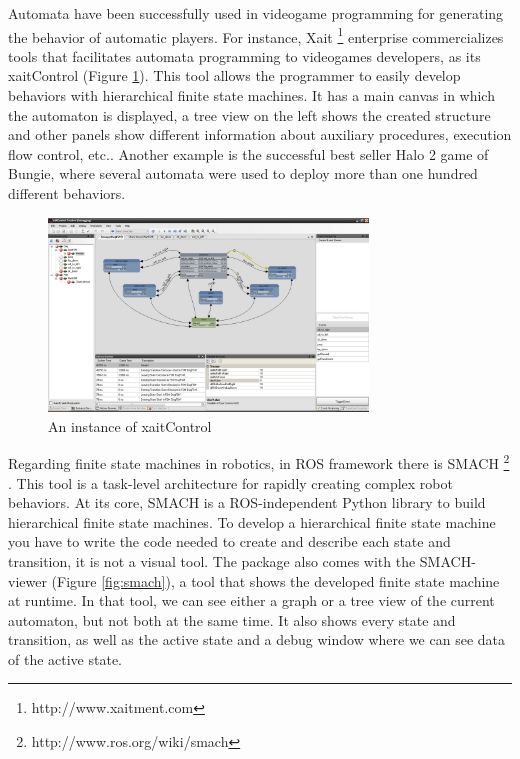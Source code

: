 \documentclass[journal,twoside]{JoPhA}
\begin{document}
Automata have been successfully used in videogame programming for generating the behavior of automatic players. For instance, Xait \footnote{http://www.xaitment.com} enterprise  commercializes  tools  that  facilitates automata programming to videogames developers, as its xaitControl (Figure \ref{fig:xaitcontrol}). This tool allows the programmer to  easily  develop  behaviors  with  hierarchical  finite  state machines. It has a main canvas in which the automaton is displayed, a tree view on the left shows the created structure and other panels show different information about auxiliary procedures, execution flow control, etc.. Another example is the successful best seller Halo 2 game of Bungie, where several automata were used to deploy more than one hundred different behaviors.

\begin{figure}[ht!]
\begin{center}
        \includegraphics[width=8.5cm]{figs/xaitcontrol.jpg}
\end{center}
\caption{An instance of xaitControl}
\label{fig:xaitcontrol}
\end{figure}

Regarding  finite  state  machines in robotics, in ROS framework there is SMACH \footnote{http://www.ros.org/wiki/smach} \cite{bohren2010,bohren2011}. This tool is a task-level architecture for rapidly creating complex robot behaviors. At its core, SMACH is a ROS-independent Python library to build hierarchical finite state machines. To develop a hierarchical finite state machine you have to write the code needed to create and describe each state and transition, it is not a visual tool. The package also comes with the SMACH-viewer (Figure \ref{fig:smach}), a tool that shows the developed finite state machine at runtime. In that tool, we can see either a graph or a tree view of the current automaton, but not both at the same time. It also shows every state and transition, as well as the active state and a debug window where we can see data of the active state.
\end{document}
